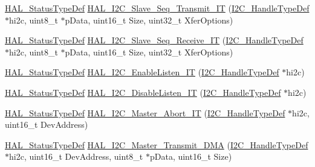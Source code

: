 \begin{DoxyCompactItemize}
\item 
\hyperlink{stm32f4xx__hal__def_8h_a63c0679d1cb8b8c684fbb0632743478f}{H\+A\+L\+\_\+\+Status\+Type\+Def} \hyperlink{group___i2_c___exported___functions___group2_ga6d4024eb28117e0836c2477a855d7531}{H\+A\+L\+\_\+\+I2\+C\+\_\+\+Slave\+\_\+\+Seq\+\_\+\+Transmit\+\_\+\+IT} (\hyperlink{group___i2_c__handle___structure__definition_ga68e9f45c2fd2161fb827ccdeabb55ea5}{I2\+C\+\_\+\+Handle\+Type\+Def} $\ast$hi2c, uint8\+\_\+t $\ast$p\+Data, uint16\+\_\+t Size, uint32\+\_\+t Xfer\+Options)
\item 
\hyperlink{stm32f4xx__hal__def_8h_a63c0679d1cb8b8c684fbb0632743478f}{H\+A\+L\+\_\+\+Status\+Type\+Def} \hyperlink{group___i2_c___exported___functions___group2_ga1e782a3b10d12e4368eb489ad728e735}{H\+A\+L\+\_\+\+I2\+C\+\_\+\+Slave\+\_\+\+Seq\+\_\+\+Receive\+\_\+\+IT} (\hyperlink{group___i2_c__handle___structure__definition_ga68e9f45c2fd2161fb827ccdeabb55ea5}{I2\+C\+\_\+\+Handle\+Type\+Def} $\ast$hi2c, uint8\+\_\+t $\ast$p\+Data, uint16\+\_\+t Size, uint32\+\_\+t Xfer\+Options)
\item 
\hyperlink{stm32f4xx__hal__def_8h_a63c0679d1cb8b8c684fbb0632743478f}{H\+A\+L\+\_\+\+Status\+Type\+Def} \hyperlink{group___i2_c___exported___functions___group2_gad8c3b67e4430bc8def0c885af769f3ab}{H\+A\+L\+\_\+\+I2\+C\+\_\+\+Enable\+Listen\+\_\+\+IT} (\hyperlink{group___i2_c__handle___structure__definition_ga68e9f45c2fd2161fb827ccdeabb55ea5}{I2\+C\+\_\+\+Handle\+Type\+Def} $\ast$hi2c)
\item 
\hyperlink{stm32f4xx__hal__def_8h_a63c0679d1cb8b8c684fbb0632743478f}{H\+A\+L\+\_\+\+Status\+Type\+Def} \hyperlink{group___i2_c___exported___functions___group2_gafd49a2b08bc6e30989c420a9c679b65e}{H\+A\+L\+\_\+\+I2\+C\+\_\+\+Disable\+Listen\+\_\+\+IT} (\hyperlink{group___i2_c__handle___structure__definition_ga68e9f45c2fd2161fb827ccdeabb55ea5}{I2\+C\+\_\+\+Handle\+Type\+Def} $\ast$hi2c)
\item 
\hyperlink{stm32f4xx__hal__def_8h_a63c0679d1cb8b8c684fbb0632743478f}{H\+A\+L\+\_\+\+Status\+Type\+Def} \hyperlink{group___i2_c___exported___functions___group2_gad001e42b424fc0d85a8e94380b9c7513}{H\+A\+L\+\_\+\+I2\+C\+\_\+\+Master\+\_\+\+Abort\+\_\+\+IT} (\hyperlink{group___i2_c__handle___structure__definition_ga68e9f45c2fd2161fb827ccdeabb55ea5}{I2\+C\+\_\+\+Handle\+Type\+Def} $\ast$hi2c, uint16\+\_\+t Dev\+Address)
\item 
\hyperlink{stm32f4xx__hal__def_8h_a63c0679d1cb8b8c684fbb0632743478f}{H\+A\+L\+\_\+\+Status\+Type\+Def} \hyperlink{group___i2_c___exported___functions___group2_ga978126d41a3a67384f4cb2fe3e6e7e8f}{H\+A\+L\+\_\+\+I2\+C\+\_\+\+Master\+\_\+\+Transmit\+\_\+\+D\+MA} (\hyperlink{group___i2_c__handle___structure__definition_ga68e9f45c2fd2161fb827ccdeabb55ea5}{I2\+C\+\_\+\+Handle\+Type\+Def} $\ast$hi2c, uint16\+\_\+t Dev\+Address, uint8\+\_\+t $\ast$p\+Data, uint16\+\_\+t Size)

\end{DoxyCompactItemize}
